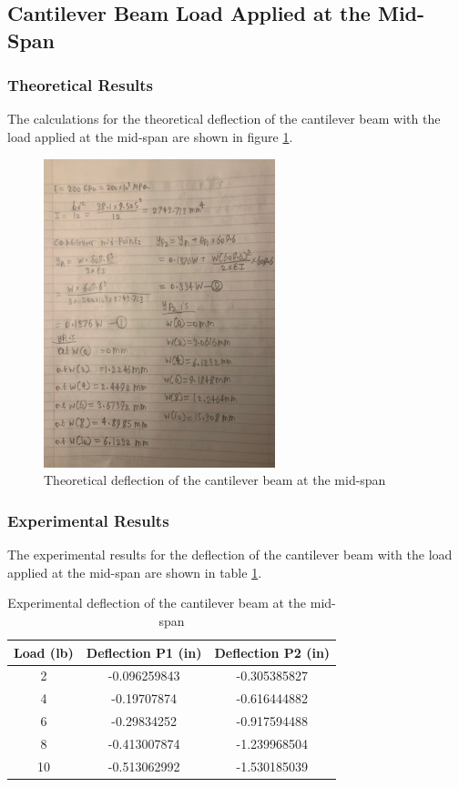\documentclass[12pt, titlepage]{article}
\begin{document}
\subsection{Cantilever Beam Load Applied at the Mid-Span}
\subsubsection{Theoretical Results}
The calculations for the theoretical deflection of the cantilever beam with the
load applied at the mid-span are shown in figure \ref{fig:TheoreticalCantileverBeamMid}.
\begin{figure}[H]
    \centering
    \includegraphics[width=0.6\textwidth]{./Images/C_M.jpeg}
    \caption{Theoretical deflection of the cantilever beam at the mid-span}
    \label{fig:TheoreticalCantileverBeamMid}
\end{figure}
\subsubsection{Experimental Results}
The experimental results for the deflection of the cantilever beam with the
load applied at the mid-span are shown in table \ref{tab:ExperimentalCantileverBeamMid}.
\begin{table}[H]
    \centering
    \caption{Experimental deflection of the cantilever beam at the mid-span}
    \label{tab:ExperimentalCantileverBeamMid}
    \begin{tabular}{|c|c|c|}
        \hline
        \textbf{Load (lb)} & \textbf{Deflection P1 (in)} & \textbf{Deflection P2 (in)}\\
        \hline
        2 & -0.096259843 & -0.305385827 \\
        \hline
        4 & -0.19707874 & -0.616444882 \\
        \hline
        6 & -0.29834252 & -0.917594488 \\
        \hline
        8 & -0.413007874 & -1.239968504 \\
        \hline
        10 & -0.513062992 & -1.530185039 \\
        \hline
    \end{tabular}
\end{table}
\end{document}
